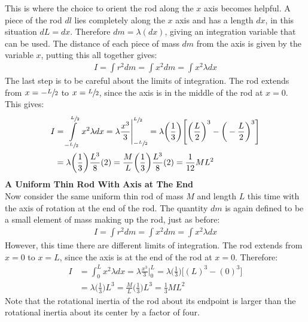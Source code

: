 \documentclass[a4paper]{article}
\let\bf\textbf
\begin{document}
This is where the choice to orient the rod along the $x$ axis becomes helpful. A piece of the rod $dl$ lies completely along the $x$ axis and has a length $dx$, in this situation $dL = dx$. Therefore $dm = \lambda(dx)$, giving an integration variable that can be used. The distance of each piece of mass $dm$ from the axis is given by the variable $x$, putting this all together gives:
\begin{align*}
    I = \int r^2dm = \int x^2dm = \int x^2\lambda dx 
\end{align*}
The last step is to be careful about the limits of integration. The rod extends from $x = -\sfrac{L}{2}$ to $x = \sfrac{L}{2}$, since the axis is in the middle of the rod at $x = 0$. This gives:
\begin{align*}
    I &= \int\limits_{-\sfrac{L}{2}}^{\sfrac{L}{2}} x^2\lambda dx = \lambda\frac{x^3}{3}\Bigg\vert_{-\sfrac{L}{2}}^{\sfrac{L}{2}} = \lambda\bigg(\frac{1}{3}\bigg)\Bigg[\bigg(\frac{L}{2}\bigg)^3 - \bigg(-\frac{L}{2}\bigg)^3\Bigg]\\
    &= \lambda\bigg(\frac{1}{3}\bigg)\frac{L^3}{8}(2) = \frac{M}{L}\bigg(\frac{1}{3}\bigg)\frac{L^3}{8}(2) = \frac{1}{12}ML^2
\end{align*}
\newpage
\noindent\bf{A Uniform Thin Rod With Axis at The End}
\vspace{2mm}\\
Now consider the same uniform thin rod of mass $M$ and length $L$ this time with the axis of rotation at the end of the rod. The quantity $dm$ is again defined to be a small element of mass making up the rod, just as before:
\begin{align*}
    I = \int r^2dm = \int x^2dm = \int x^2\lambda dx
\end{align*}
However, this time there are different limits of integration. The rod extends from $x = 0$ to $x = L$, since the axis is at the end of the rod at $x = 0$. Therefore:
\begin{align*}
    I &= \int_{0}^{L}x^2\lambda dx = \lambda\frac{x^3}{3} \Bigg\vert_0^L = \lambda \bigg(\frac{1}{3}\bigg)\Big[(L)^3 - (0)^3\Big]\\
    &= \lambda\bigg(\frac{1}{3}\bigg)L^3 = \frac{M}{L}\bigg(\frac{1}{3}\bigg)L^3 = \frac{1}{3}ML^2
\end{align*}
Note that the rotational inertia of the rod about its endpoint is larger than the rotational inertia about its center by a factor of four.
\end{document}
